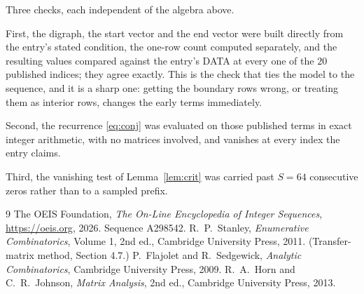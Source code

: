 \documentclass[11pt,a4paper]{article}
\theoremstyle{plain}
\theoremstyle{definition}
\begin{document}
Three checks, each independent of the algebra above.

First, the digraph, the start vector and the end vector were built directly from the
entry's stated condition, the one-row count computed separately, and the resulting values
compared against the entry's DATA at every one of the $20$ published indices; they
agree exactly. This is the check that ties the model to the sequence, and it is a sharp one:
getting the boundary rows wrong, or treating them as interior rows, changes the early terms
immediately.

Second, the recurrence \eqref{eq:conj} was evaluated on those published terms in exact
integer arithmetic, with no matrices involved, and vanishes at every index the entry claims.

Third, the vanishing test of Lemma~\ref{lem:crit} was carried past $S=64$ consecutive
zeros rather than to a sampled prefix.

\begin{thebibliography}{9}
 The OEIS Foundation, \emph{The On-Line Encyclopedia of Integer
Sequences}, \url{https://oeis.org}, 2026. Sequence A298542.
 R.~P.~Stanley, \emph{Enumerative Combinatorics}, Volume 1, 2nd ed.,
Cambridge University Press, 2011. (Transfer-matrix method, Section 4.7.)
 P.~Flajolet and R.~Sedgewick, \emph{Analytic Combinatorics}, Cambridge
University Press, 2009.
 R.~A.~Horn and C.~R.~Johnson, \emph{Matrix Analysis}, 2nd ed., Cambridge
University Press, 2013.
\end{thebibliography}
\end{document}
